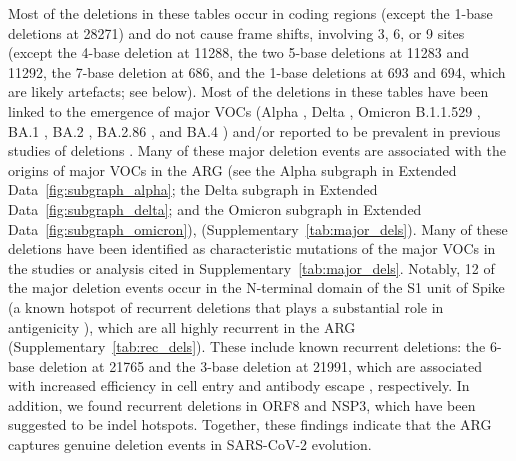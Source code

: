 \documentclass[12pt]{article}
\newcommand{\edref}[1]{Extended Data~\ref{#1}}
\newcommand{\siref}[1]{Supplementary~\ref{#1}}
\begin{document}
Most of the deletions in these tables occur in coding regions
(except the 1-base deletions at 28271) and
do not cause frame shifts, involving 3, 6, or 9 sites
(except
the 4-base deletion at 11288,
the two 5-base deletions at 11283 and 11292,
the 7-base deletion at 686, and
the 1-base deletions at 693 and 694,
which are likely artefacts; see below).
Most of the deletions in these tables
have been linked to the emergence of major VOCs
(Alpha \cite{RambautAlpha2020},
Delta \cite{Stern2021},
Omicron B.1.1.529 \cite{RambautOmicron2021},
BA.1 \cite{RambautOmicron2021},
BA.2 \cite{RambautOmicron2021},
BA.2.86 \cite{Planas2024}, and
BA.4 \cite{Tegally2022})
and/or reported to be prevalent
in previous studies of deletions \cite{Li2023indels}.
Many of these major deletion events
are associated with the origins of major VOCs in the ARG
(see the Alpha subgraph in \edref{fig:subgraph_alpha};
the Delta subgraph in \edref{fig:subgraph_delta}; and
the Omicron subgraph in \edref{fig:subgraph_omicron}),
(\siref{tab:major_dels}).
Many of these deletions have been identified
as characteristic mutations of the major VOCs
in the studies or analysis cited in \siref{tab:major_dels}.
Notably, 12 of the major deletion events occur
in the N-terminal domain of the S1 unit of Spike
(a known hotspot of recurrent deletions \cite{McCarthy2021}
that plays a substantial role in antigenicity \cite{Harvey2021}),
which are all highly recurrent in the ARG
(\siref{tab:rec_dels}).
These include known recurrent deletions:
the 6-base deletion at 21765 and
the 3-base deletion at 21991,
which are associated with
increased efficiency in cell entry \cite{Meng2021} and
antibody escape \cite{McCarthy2021}, respectively.
In addition, we found recurrent deletions in ORF8 and NSP3,
which have been suggested to be indel hotspots\cite{Akaishi2022}.
Together, these findings indicate that
the ARG captures genuine deletion events in SARS-CoV-2 evolution.
\end{document}
